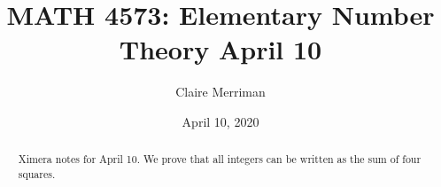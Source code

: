 \documentclass{xourse}
\title{MATH 4573: Elementary Number Theory April 10}
\author{Claire Merriman}
\date{April 10, 2020}
\begin{document}
  
\begin{abstract} %
Ximera notes for April 10. We prove that all integers can be written as the sum of four squares.
\end{abstract}  
\maketitle 
 
 
\end{document}
